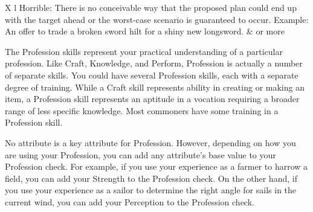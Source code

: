 \begin{columntable}
\begin{dtabularx}{\columnwidth}{X l}
          Horrible: There is no conceivable way that the proposed plan could end up with the target ahead or the worst-case scenario is guaranteed to occur. Example: An offer to trade a broken sword hilt for a shiny new longsword.                                                                                      &  or more                                                    \\
        \end{dtabularx}
      \end{columntable}

\newpage
{}
  The Profession skills represent your practical understanding of a particular profession.
  Like Craft, Knowledge, and Perform, Profession is actually a number of separate skills.
  You could have several Profession skills, each with a separate degree of training.
  While a Craft skill represents ability in creating or making an item, a Profession skill represents an aptitude in a vocation requiring a broader range of less specific knowledge.
  Most commoners have some training in a Profession skill.

  No attribute is a key attribute for Profession.
  However, depending on how you are using your Profession, you can add any attribute's base value to your Profession check.
  For example, if you use your experience as a farmer to harrow a field, you can add your Strength to the Profession check.
  On the other hand, if you use your experience as a sailor to determine the right angle for sails in the current wind, you can add your Perception to the Profession check.

